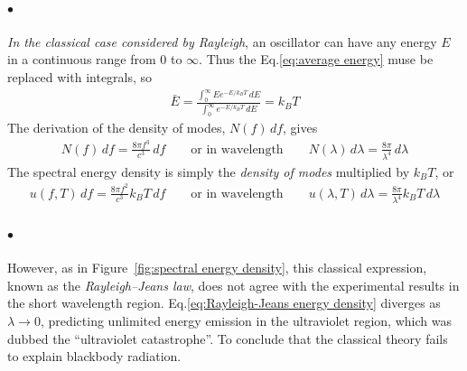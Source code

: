     \paragraph{\color{c3}$\bullet$} \textit{In the classical case considered by Rayleigh}, an oscillator can have any energy $E$ in
    a continuous range from 0 to $\infty$. Thus the Eq.\eqref{eq:average energy} muse be replaced with integrals, so 
    \begin{align}
        \label{eq:average energy integral}
        \bar{E} = \frac{\int_0^\infty Ee^{-E/k_B T}\, dE}{\int_0^\infty e^{-E/k_B T}\, dE} = k_B T
    \end{align}
    The derivation of the density of modes, $N( f )\, df$, gives
    \begin{align}
        \label{eq:density of modes}
        N(f)\, df = \frac{8 \pi f^3}{c^3} \, df \qquad \text{or in wavelength} \qquad 
        N(\lambda) \, d\lambda = \frac{8 \pi }{\lambda^4}\, d\lambda  
    \end{align}
    The spectral energy density is simply the \textit{density of modes} multiplied by $k_B T$, or
    \begin{align}
        \label{eq:Rayleigh-Jeans energy density}
        u(f, T)\, df = \frac{8 \pi f^2}{c^3} k_B T\, df \qquad \text{or in wavelength} \qquad 
        u(\lambda, T)\, d\lambda = \frac{8 \pi}{\lambda^4} k_B T\, d\lambda
    \end{align}
    
    \paragraph{\color{c3}$\bullet$} However, as in Figure~\ref{fig:spectral energy density}, this classical expression, 
    known as the \textit{Rayleigh–Jeans law}, does not agree with the experimental results in the short wavelength region.
    Eq.\eqref{eq:Rayleigh-Jeans energy density} diverges as $\lambda \to 0$, predicting unlimited energy emission in the 
    ultraviolet region, which was dubbed the “ultraviolet catastrophe”. To conclude that the classical theory fails 
    to explain blackbody radiation.

